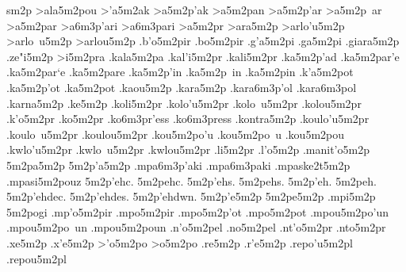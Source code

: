 {sm2p
>ala5m2pou   %
>'a5m2ak     %
>a5m2p'ak
>a5m2pan     %
>a5m2p'ar    %
>a5m2p~ar
>a5m2par
  >a6m3p'ari   %
  >a6m3pari
>a5m2pr      %
>ara5m2p     %
>arlo'u5m2p  %
>arlo~u5m2p
>arlou5m2p
.b'o5m2pir   %
.bo5m2pir    %
.g'a5m2pi    %
.ga5m2pi
.giara5m2p 		%
.ze"i5m2p    %
>i5m2pra     %
.kala5m2pa   %
.kal'i5m2pr  %
.kali5m2pr  
.ka5m2p'ad   %
.ka5m2par'e  %
.ka5m2par`e
.ka5m2pare
.ka5m2p'in   %
.ka5m2p~in
.ka5m2pin
.k'a5m2pot   %
.ka5m2p'ot
.ka5m2pot
.kaou5m2p    %
.kara5m2p    %
  .kara6m3p'ol %
  .kara6m3pol
.karna5m2p   %
.ke5m2p      %
.koli5m2pr   %
.kolo'u5m2pr %
.kolo~u5m2pr
.kolou5m2pr
.k'o5m2pr    %
.ko5m2pr
  .ko6m3pr'ess %
  .ko6m3press
.kontra5m2p  %
.koulo'u5m2pr %
.koulo~u5m2pr
.koulou5m2pr
.kou5m2po'u  %
.kou5m2po~u
.kou5m2pou
.kwlo'u5m2pr %
.kwlo~u5m2pr
.kwlou5m2pr
.li5m2pr     %
.l'o5m2p     %
.manit'o5m2p %
5m2pa5m2p    %
5m2p'a5m2p   %
  .mpa6m3p'aki %
  .mpa6m3paki
.mpaske2t5m2p  %
.mpasi5m2pouz %
5m2p'ehc.    %
5m2pehc.
5m2p'ehs.
5m2pehs.
5m2p'eh.
5m2peh.
5m2p'ehdec.
5m2p'ehdes.
5m2p'ehdwn.
5m2p'e5m2p   %
5m2pe5m2p
.mpi5m2p     %
5m2pogi      %
.mp'o5m2pir  %
.mpo5m2pir   %
.mpo5m2p'ot  %
.mpo5m2pot
.mpou5m2po'un %
.mpou5m2po~un 
.mpou5m2poun 
.n'o5m2pel   %
.no5m2pel    
.nt'o5m2pr   %
.nto5m2pr
.xe5m2p      %
.x'e5m2p
>'o5m2po     %
>o5m2po
.re5m2p      %
.r'e5m2p     %
.repo'u5m2pl %
.repou5m2pl  %
}
